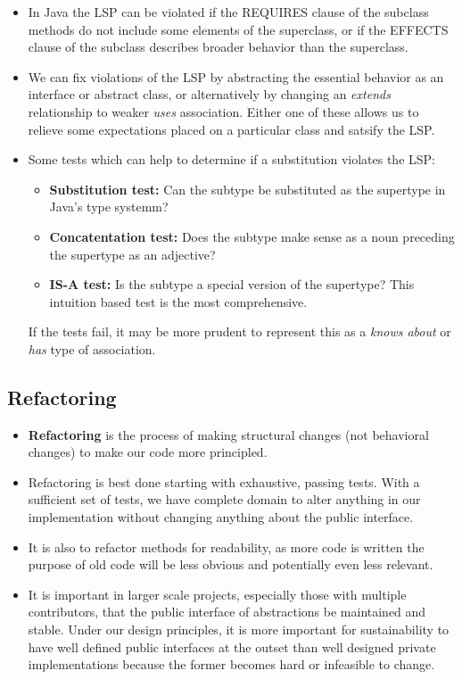 \documentclass[letterpaper] {article}
\begin{document}
    \begin{itemize}
        \item In Java the LSP can be violated if the REQUIRES clause of the subclass methods do not include some elements of the superclass, or if the EFFECTS clause of the subclass describes broader behavior than the superclass. 
        \item We can fix violations of the LSP by abstracting the essential behavior as an interface or abstract class, or alternatively by changing an \textit{extends} relationship to weaker \textit{uses} association. Either one of these allows us to relieve some expectations placed on a particular class and satsify the LSP. 
        \item Some tests which can help to determine if a substitution violates the LSP:
            \begin{itemize}
                \item \textbf{Substitution test:} Can the subtype be substituted as the supertype in Java's type systemm?
                \item \textbf{Concatentation test:} Does the subtype make sense as a noun preceding the supertype as an adjective?
                \item \textbf{IS-A test:} Is the subtype a special version of the supertype? This intuition based test is the most comprehensive. 
            \end{itemize}
            If the tests fail, it may be more prudent to represent this as a \textit{knows about} or \textit{has} type of association. 
    \end{itemize}

    \subsection{Refactoring}
    \begin{itemize}
        \item \textbf{Refactoring} is the process of making structural changes (not behavioral changes) to make our code more principled. 
        \item Refactoring is best done starting with exhaustive, passing tests. With a sufficient set of tests, we have complete domain to alter anything in our implementation without changing anything about the public interface. 
        \item It is also to refactor methods for readability, as more code is written the purpose of old code will be less obvious and potentially even less relevant. 
        \item It is important in larger scale projects, especially those with multiple contributors, that the public interface of abstractions be maintained and stable. Under our design principles, it is more important for sustainability to have well defined public interfaces at the outset than well designed private implementations because the former becomes hard or infeasible to change. 
    \end{itemize}
\end{document}
